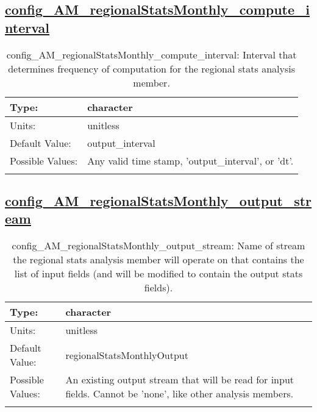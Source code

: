 \subsection[config\_AM\_regionalStatsMonthly\_compute\_interval]{\hyperref[sec:nm_tab_AM_regionalStatsMonthly]{config\_AM\_regionalStatsMonthly\_compute\_interval}}
\label{subsec:nm_sec_config_AM_regionalStatsMonthly_compute_interval}
\begin{center}
\begin{longtable}{| p{2.0in} || p{4.0in} |}
    \hline
    Type: & character \\
    \hline
    Units: & \si{unitless} \\
    \hline
    Default Value: & output\_interval \\
    \hline
    Possible Values: & Any valid time stamp, 'output\_interval', or 'dt'. \\
    \hline
    \caption{config\_AM\_regionalStatsMonthly\_compute\_interval: Interval that determines frequency of computation for the regional stats analysis member.}
\end{longtable}
\end{center}
\subsection[config\_AM\_regionalStatsMonthly\_output\_stream]{\hyperref[sec:nm_tab_AM_regionalStatsMonthly]{config\_AM\_regionalStatsMonthly\_output\_stream}}
\label{subsec:nm_sec_config_AM_regionalStatsMonthly_output_stream}
\begin{center}
\begin{longtable}{| p{2.0in} || p{4.0in} |}
    \hline
    Type: & character \\
    \hline
    Units: & \si{unitless} \\
    \hline
    Default Value: & regionalStatsMonthlyOutput \\
    \hline
    Possible Values: & An existing output stream that will be read for input fields. Cannot be 'none', like other analysis members. \\
    \hline
    \caption{config\_AM\_regionalStatsMonthly\_output\_stream: Name of stream the regional stats analysis member will operate on that contains the list of input fields (and will be modified to contain the output stats fields).}
\end{longtable}
\end{center}
